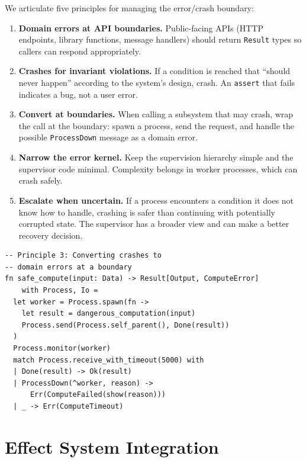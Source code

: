 \documentclass[11pt,twocolumn]{article}
\newcommand{\Result}{\texttt{Result}}
\begin{document}
We articulate five principles for managing the error/crash boundary:

\begin{enumerate}[leftmargin=*]
  \item \textbf{Domain errors at API boundaries.} Public-facing APIs (HTTP endpoints, library functions, message handlers) should return \Result{} types so callers can respond appropriately.

  \item \textbf{Crashes for invariant violations.} If a condition is reached that ``should never happen'' according to the system's design, crash. An \texttt{assert} that fails indicates a bug, not a user error.

  \item \textbf{Convert at boundaries.} When calling a subsystem that may crash, wrap the call at the boundary: spawn a process, send the request, and handle the possible \texttt{ProcessDown} message as a domain error.

  \item \textbf{Narrow the error kernel.} Keep the supervision hierarchy simple and the supervisor code minimal. Complexity belongs in worker processes, which can crash safely.

  \item \textbf{Escalate when uncertain.} If a process encounters a condition it does not know how to handle, crashing is safer than continuing with potentially corrupted state. The supervisor has a broader view and can make a better recovery decision.
\end{enumerate}

\begin{lstlisting}
-- Principle 3: Converting crashes to
-- domain errors at a boundary
fn safe_compute(input: Data) -> Result[Output, ComputeError]
    with Process, Io =
  let worker = Process.spawn(fn ->
    let result = dangerous_computation(input)
    Process.send(Process.self_parent(), Done(result))
  )
  Process.monitor(worker)
  match Process.receive_with_timeout(5000) with
  | Done(result) -> Ok(result)
  | ProcessDown(^worker, reason) ->
      Err(ComputeFailed(show(reason)))
  | _ -> Err(ComputeTimeout)
\end{lstlisting}

\section{Effect System Integration}\label{sec:effects}
\end{document}
